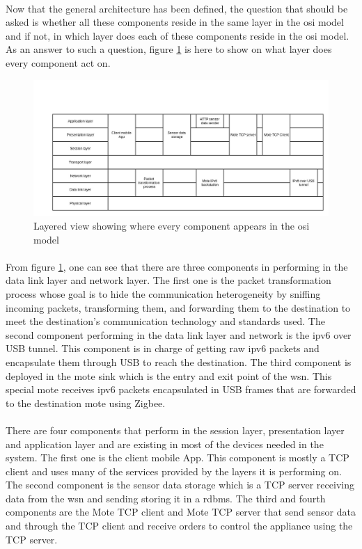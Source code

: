 \documentclass[oneside,12pt,a4paper,final]{book}
\begin{document}
\paragraph{}
Now that the general architecture has been defined, the question that should be asked is whether all these components reside in the same layer in the \gls{osi} model and if not, in which layer does each of these components reside in the \gls{osi} model. As an answer to such a question, figure \ref{fig:layered_view} is here to show on what layer does every component act on.

\begin{figure}[htbp]
\centering
\includegraphics[scale=0.40]{img/layered_view.jpg}
\caption{Layered view showing where every component appears in the \gls{osi} model}
\label{fig:layered_view}
\end{figure}
\paragraph{}
From figure \ref{fig:layered_view}, one can see that there are three components in performing in the data link layer and network layer. The first one is the packet transformation process whose goal is to hide the communication heterogeneity by sniffing incoming packets, transforming them, and forwarding them to the destination to meet the destination's communication technology and standards used. The second component performing in the data link layer and network is the \gls{ipv6} over USB tunnel. This component is in charge of getting raw \gls{ipv6} packets and encapsulate them through USB to reach the destination. The third component is deployed in the mote sink which is the entry and exit point of the \gls{wsn}. This special mote receives \gls{ipv6} packets encapsulated in USB frames that are forwarded to the destination mote using Zigbee.

\paragraph{}
There are four components that perform in the session layer, presentation layer and application layer and are existing in most of the devices needed in the system. The first one is the client mobile App. This component is mostly a TCP client and uses many of the services provided by the layers it is performing on. The second component is the sensor data storage which is a TCP server receiving data from the \gls{wsn} and sending storing it in a \gls{rdbms}. The third and fourth components are the Mote TCP client and Mote TCP server that send sensor data and through the TCP client and receive orders to control the appliance using the TCP server. 
\end{document}
